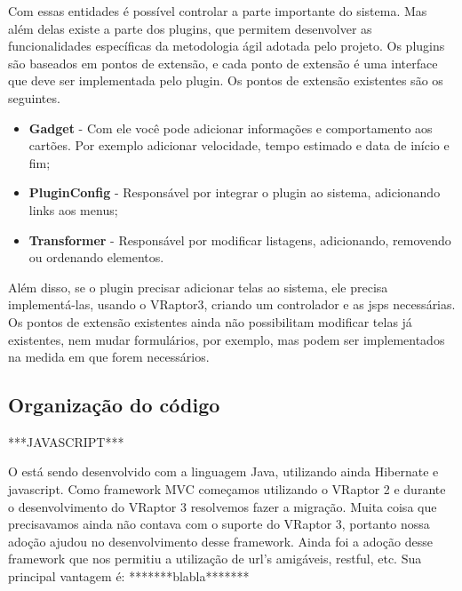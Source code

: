 Com essas entidades é possível controlar a parte importante do sistema. Mas além delas existe a parte dos plugins, que permitem desenvolver as funcionalidades específicas da metodologia ágil adotada pelo projeto. Os plugins são baseados em pontos de extensão, e cada ponto de extensão é uma interface que deve ser implementada pelo plugin. Os pontos de extensão existentes são os seguintes.

\begin{itemize}
	\item{\textbf{Gadget} - Com ele você pode adicionar informações e comportamento aos cartões. Por exemplo adicionar velocidade, tempo estimado e data de início e fim;}
	\item{\textbf{PluginConfig} - Responsável por integrar o plugin ao sistema, adicionando links aos menus;}
	\item{\textbf{Transformer} - Responsável por modificar listagens, adicionando, removendo ou ordenando elementos.}
\end{itemize}

Além disso, se o plugin precisar adicionar telas ao sistema, ele precisa implementá-las, usando o VRaptor3, criando um controlador e as jsps necessárias. Os pontos de extensão existentes ainda não possibilitam modificar telas já existentes, nem mudar formulários, por exemplo, mas podem ser implementados na medida em que forem necessários.

\subsection{Organização do código}


***JAVASCRIPT***


O \calopsita está sendo desenvolvido com a linguagem Java, utilizando ainda Hibernate e javascript. Como framework MVC começamos utilizando o VRaptor 2 e durante o desenvolvimento do VRaptor 3 resolvemos fazer a migração. Muita coisa que precisavamos ainda não contava com o suporte do VRaptor 3, portanto nossa adoção ajudou no desenvolvimento desse framework. Ainda foi a adoção desse framework que nos permitiu a utilização de url's amigáveis, restful, etc. Sua principal vantagem é: *******blabla*******
